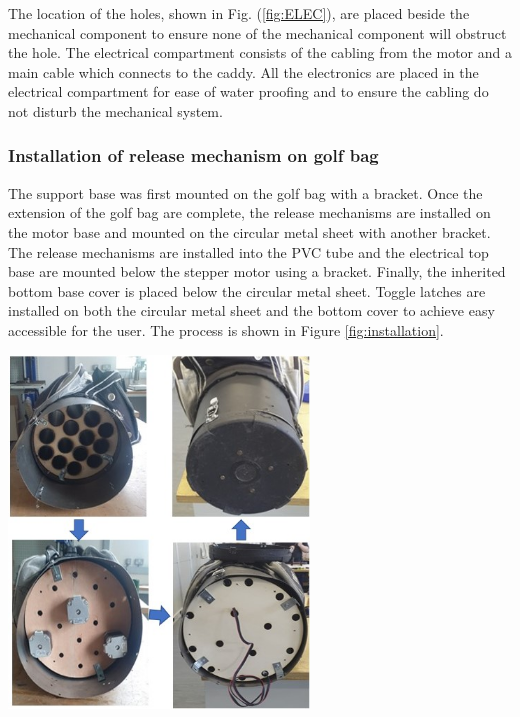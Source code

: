 \documentclass[11pt,landscape]{article}
\newenvironment{Figure}
  {\par\medskip\noindent\minipage{\linewidth}}
  {\endminipage\par\medskip}
\begin{document}
\begin{multicols}{3}
    The location of the holes, shown in Fig. (\ref{fig:ELEC}), are placed beside the
    mechanical component to ensure none of the mechanical
    component will obstruct the hole. The electrical compartment consists of the
    cabling from the motor and a main cable which connects to the caddy. All the
    electronics are placed in the electrical compartment for ease of water
    proofing and to ensure the cabling do not disturb the mechanical system. 
    
    \subsubsection{Installation of release mechanism on golf bag }
    The support base was first mounted on the golf bag with a bracket. Once the
    extension of the golf bag are complete, the release mechanisms are installed
    on the motor base and mounted on the circular metal sheet with another
    bracket. The release mechanisms are installed into the PVC tube and the
    electrical top base are mounted below the stepper motor using a bracket.
    Finally, the inherited bottom base cover is placed below the circular
    metal sheet. Toggle latches are installed on both the circular metal sheet
    and the bottom cover to achieve easy accessible for the user. The process is
    shown in Figure \ref{fig:installation}.
    \begin{Figure}
        \begin{center}
            \includegraphics[width=0.6\textwidth]{Figure30.jpg}
            \label{fig:installation}
        \end{center}
    \end{Figure}


\end{multicols}
\end{document}
